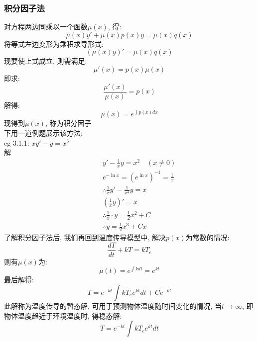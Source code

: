 \subsubsection{\large 积分因子法}
对方程两边同乘以一个函数$\mu(x)$, 得:
{\Large
\begin{equation}
\mu(x) y' + \mu(x) p(x) y = \mu(x) q(x)
\end{equation}
}
将等式左边变形为乘积求导形式:
{\Large \[ (\mu(x) y)' = \mu(x) q(x) \]}
现要使上式成立, 则需满足:
{\Large \[ \mu'(x) = p(x) \mu(x) \]}
即求:
{\Large \[ \frac{\mu'(x)}{\mu(x)} = p(x) \]}
解得:
{\Large
\begin{equation}
\mu(x) = e^{\int p(x) dx}
\end{equation}
}
现得到$\mu(x)$, 称为积分因子\\
下用一道例题展示该方法:\\
eg 3.1.1: \hspace*{6em} $xy' - y = x^3$\\
\hspace*{2em}解
{\begin{align*}
    & \qquad y' - \frac{1}{x}y = x^2 \quad (x \neq 0) \\
    & \qquad e^{-\ln x} = (e^{\ln x})^{-1} = \frac{1}{x} \\
    & \qquad \therefore \frac{1}{x}y' - \frac{1}{x^2}y = x \\
    & \qquad \left( \frac{1}{x} y \right)' = x \\
    & \qquad \therefore \frac{1}{x} \cdot y = \frac{1}{2}x^2 + C \\
    & \qquad \therefore y = \frac{1}{2}x^3 + Cx
\end{align*}
}
了解积分因子法后, 我们再回到温度传导模型中, 解决$p(x)$为常数的情况:
{\Large \[ \frac{dT}{dt} + k T = k T_e \]}
则有$\mu(x)$为:
{\Large \[ \mu(t) = e^{\int k dt} = e^{kt} \]}
最后解得:
{\Large
\begin{equation}
T = e^{-kt} \int k T_e e^{kt} dt + C e^{-kt}
\end{equation}
}
此解称为温度传导的暂态解, 可用于预测物体温度随时间变化的情况, 
当$t \to \infty$, 即物体温度趋近于环境温度时, 得稳态解:
{\Large
\begin{equation}
T = e^{-kt} \int k T_e e^{kt} dt
\end{equation}
}

